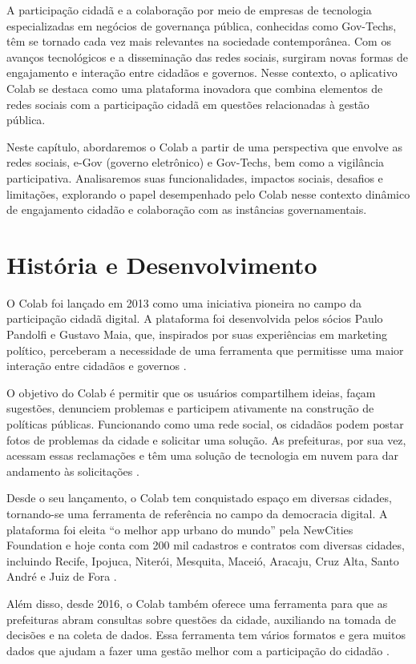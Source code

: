 A participação cidadã e a colaboração por meio de empresas de tecnologia especializadas em negócios de governança pública, conhecidas como Gov-Techs,  têm se tornado cada vez mais relevantes na sociedade contemporânea. Com os avanços tecnológicos e a disseminação das redes sociais, surgiram novas formas de engajamento e interação entre cidadãos e governos. Nesse contexto, o aplicativo Colab se destaca como uma plataforma inovadora que combina elementos de redes sociais com a participação cidadã em questões relacionadas à gestão pública.

Neste capítulo, abordaremos o Colab a partir de uma perspectiva que envolve as redes sociais, e-Gov (governo eletrônico) e Gov-Techs, bem como a vigilância participativa. Analisaremos suas funcionalidades, impactos sociais, desafios e limitações, explorando o papel desempenhado pelo Colab nesse contexto dinâmico de engajamento cidadão e colaboração com as instâncias governamentais.

\section{História e Desenvolvimento}
O Colab foi lançado em 2013 como uma iniciativa pioneira no campo da participação cidadã digital. A plataforma foi desenvolvida pelos sócios Paulo Pandolfi e Gustavo Maia, que, inspirados por suas experiências em marketing político, perceberam a necessidade de uma ferramenta que permitisse uma maior interação entre cidadãos e governos \cite{2023_Colab_PAGE}.

O objetivo do Colab é permitir que os usuários compartilhem ideias, façam sugestões, denunciem problemas e participem ativamente na construção de políticas públicas. Funcionando como uma rede social, os cidadãos podem postar fotos de problemas da cidade e solicitar uma solução. As prefeituras, por sua vez, acessam essas reclamações e têm uma solução de tecnologia em nuvem para dar andamento às solicitações \cite{2023_Colab_PAGE}.

Desde o seu lançamento, o Colab tem conquistado espaço em diversas cidades, tornando-se uma ferramenta de referência no campo da democracia digital. A plataforma foi eleita “o melhor app urbano do mundo” pela NewCities Foundation e hoje conta com 200 mil cadastros e contratos com diversas cidades, incluindo Recife, Ipojuca, Niterói, Mesquita, Maceió, Aracaju, Cruz Alta, Santo André e Juiz de Fora \cite{2023_Colab_PAGE}.

Além disso, desde 2016, o Colab também oferece uma ferramenta para que as prefeituras abram consultas sobre questões da cidade, auxiliando na tomada de decisões e na coleta de dados. Essa ferramenta tem vários formatos e gera muitos dados que ajudam a fazer uma gestão melhor com a participação do cidadão \cite{2023_Colab_PAGE}.

